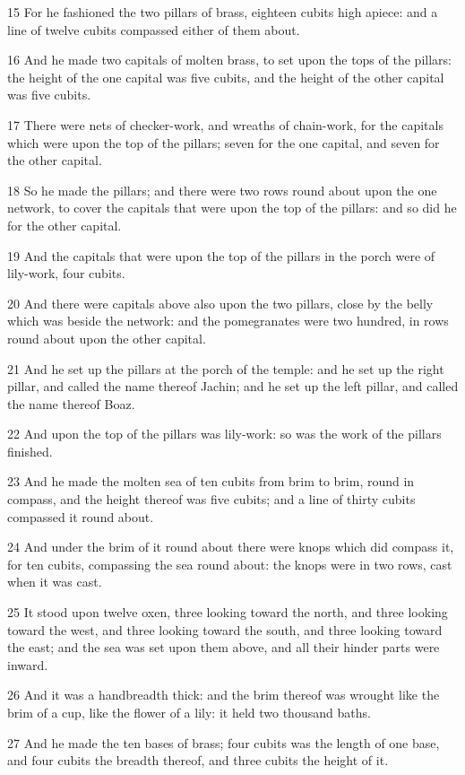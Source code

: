 \par 15 For he fashioned the two pillars of brass, eighteen cubits high apiece: and a line of twelve cubits compassed either of them about.
\par 16 And he made two capitals of molten brass, to set upon the tops of the pillars: the height of the one capital was five cubits, and the height of the other capital was five cubits.
\par 17 There were nets of checker-work, and wreaths of chain-work, for the capitals which were upon the top of the pillars; seven for the one capital, and seven for the other capital.
\par 18 So he made the pillars; and there were two rows round about upon the one network, to cover the capitals that were upon the top of the pillars: and so did he for the other capital.
\par 19 And the capitals that were upon the top of the pillars in the porch were of lily-work, four cubits.
\par 20 And there were capitals above also upon the two pillars, close by the belly which was beside the network: and the pomegranates were two hundred, in rows round about upon the other capital.
\par 21 And he set up the pillars at the porch of the temple: and he set up the right pillar, and called the name thereof Jachin; and he set up the left pillar, and called the name thereof Boaz.
\par 22 And upon the top of the pillars was lily-work: so was the work of the pillars finished.
\par 23 And he made the molten sea of ten cubits from brim to brim, round in compass, and the height thereof was five cubits; and a line of thirty cubits compassed it round about.
\par 24 And under the brim of it round about there were knops which did compass it, for ten cubits, compassing the sea round about: the knops were in two rows, cast when it was cast.
\par 25 It stood upon twelve oxen, three looking toward the north, and three looking toward the west, and three looking toward the south, and three looking toward the east; and the sea was set upon them above, and all their hinder parts were inward.
\par 26 And it was a handbreadth thick: and the brim thereof was wrought like the brim of a cup, like the flower of a lily: it held two thousand baths.
\par 27 And he made the ten bases of brass; four cubits was the length of one base, and four cubits the breadth thereof, and three cubits the height of it.

